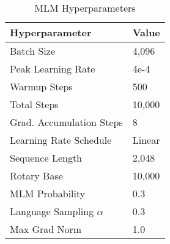 \begin{table}[h]
\centering
\caption{MLM Hyperparameters}
\vspace{1.5pt}
\begin{tabular}{ll}
\hline
\textbf{Hyperparameter} & \textbf{Value} \\
\hline
Batch Size & 4,096 \\
Peak Learning Rate & 4e-4 \\
Warmup Steps & 500 \\
Total Steps & 10,000 \\
Grad. Accumulation Steps & 8 \\
Learning Rate Schedule & Linear \\
Sequence Length & 2,048 \\
Rotary Base & 10,000 \\
MLM Probability & 0.3 \\
Language Sampling $\alpha$ & 0.3 \\ 
Max Grad Norm & 1.0 \\
\hline
\end{tabular}
\label{tab:mlm_hyperparameters}
\end{table}

\begin{table*}
\caption{Hyperparameters used for finetuning all models on GLUE benchmark tasks. For mGTE, warmup percentage is set to 6\% and max gradient norm to 1.}
\vskip 0.15in
\centering
{}
\label{tab:glue-compare}
\end{table*}